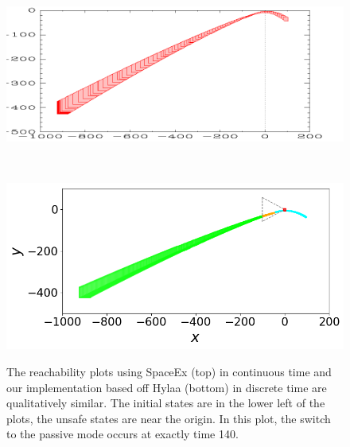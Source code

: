 \begin{figure}
\begin{minipage}{0.48\textwidth}
\begin{minipage}[b]{\linewidth}
  \centering
    \includegraphics[width=0.98\columnwidth,trim=-7em 0em 7em 0, clip]{images/spaceex.png}
\end{minipage}
\\
\vspace{1em}
\begin{minipage}[b]{\linewidth}
  \centering
    \includegraphics[width=0.98\columnwidth,trim=0 0em 0 0, clip]{images/step_d_0_25.png}
\label{fig:hylaa_qualitative}
\end{minipage}
\caption{{ The reachability plots using SpaceEx (top) in continuous time and our implementation based off Hylaa (bottom) in discrete time are qualitatively similar.
The initial states are in the lower left of the plots, the unsafe states are near the origin. In this plot, the switch to the passive mode occurs at exactly time 140.}}\label{fig:qualitative}
\end{minipage}
\hspace{1em}
\begin{minipage}{0.48\textwidth}
\begin{minipage}[b]{\linewidth}

\end{minipage}
\end{minipage}
\end{figure}
